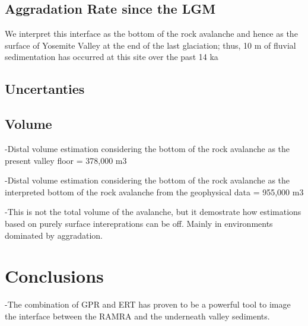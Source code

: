 \documentclass[5p]{elsarticle}
\newcommand{\COMON}{\begin{color}{blue}}
\newcommand{\COMOFF}{\end{color}}
\begin{document}
\subsection{Aggradation Rate since the LGM}

We interpret this interface as the bottom of the rock avalanche and hence as the surface of Yosemite Valley at the end of the last glaciation; thus,   10 m of fluvial sedimentation has occurred at this site over the past 14 ka


\subsection{Uncertanties}

 



\subsection{Volume}

-Distal volume estimation considering the bottom of the rock avalanche as the present valley floor =  378,000 m3

-Distal volume estimation considering the bottom of the rock avalanche as the interpreted bottom of the rock avalanche from the geophysical data = 955,000 m3 

-This is not the total volume of the avalanche, but it demostrate how estimations based on purely surface intereprations can be off. Mainly in environments dominated by aggradation. 


\bigskip  


\section{Conclusions}

-The combination of GPR and ERT has proven to be a powerful tool to image the interface between the RAMRA and the underneath valley sediments. 
\end{document}
